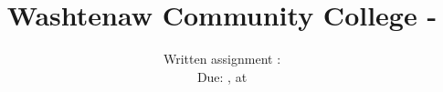 \makeatletter
\def\@maketitle{%
	\newpage
	\null
	\vspace*{-2.5em}
	\hspace*{-1.5 em}
	\begin{minipage}{0.65\linewidth}
		\begin{flushleft}
			\let \footnote \thanks
			{\noindent \large \@title \par}%
			\lineskip 1em
			{\noindent \@date \par}%
			\lineskip .5em
			\begin{tcolorbox}[colback=white,colframe=black,boxsep=0.5px,arc=0px,text width=25em,segmentation style={solid}]
				\hspace{-1em} Name:
			\end{tcolorbox}
		\end{flushleft}
	\end{minipage}	
	\begin{minipage}{.35\linewidth}
		
	\end{minipage}
	
}
\makeatother


\title{Washtenaw Community College -  }
\date{Written assignment :  \\ Due: ,  at }
